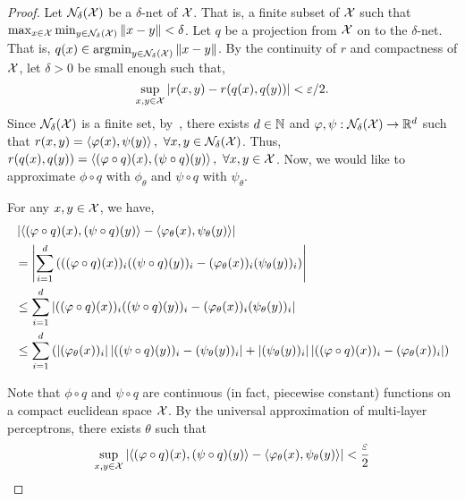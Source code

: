 \begin{proof}
    \hphantom{~}

    Let ${\mathcal{N}}_\delta({\mathcal{X}})$ be a $\delta$-net of ${\mathcal{X}}$. That is, a finite subset of ${\mathcal{X}}$ such that $\max_{x \in {\mathcal{X}}} \min_{y \in {\mathcal{N}}_\delta({\mathcal{X}})} \left\lVert x - y\right\rVert < \delta$. Let $q$ be a projection from ${\mathcal{X}}$ on to the $\delta$-net. That is, $q(x) \in \mathop{\rm argmin}_{y \in {\mathcal{N}}_\delta({\mathcal{X}})} \left\lVert x - y\right\rVert$. By the continuity of $r$ and compactness of ${\mathcal{X}}$, let $\delta > 0$ be small enough such that,
    \begin{equation*}
        \sup_{x, y \in \calX} \abs{r(x,y) - r(q(x), q(y))} < \varepsilon / 2.
    \end{equation*}
    Since ${\mathcal{N}}_\delta({\mathcal{X}})$ is a finite set, by~, there exists $d \in {\mathbb{N}}$ and $\varphi, \psi: {\mathcal{N}}_\delta({\mathcal{X}}) \to \mathbb{R}^d$ such that $r(x, y) = \left \langle \varphi(x), \psi(y) \right\rangle, \ \forall x,y \in {\mathcal{N}}_\delta({\mathcal{X}})$. Thus, $r(q(x), q(y)) = \left \langle (\varphi \circ q)(x), (\psi \circ q)(y) \right\rangle, \ \forall x,y \in {\mathcal{X}}$.  Now, we would like to approximate $\phi \circ q$ with $\phi_\theta$ and $\psi \circ q$ with $\psi_\theta$.

    For any $x, y \in {\mathcal{X}}$, we have,
    \begin{equation*}
        \begin{split}
            &\abs{\iprod{(\phi \circ q)(x)}{(\psi \circ q)(y)} - \iprod{\phi_\theta(x)}{\psi_\theta(y)}} \\
            &= \abs{\sum_{i=1}^{d} \paren{((\phi \circ q)(x))_i ((\psi \circ q)(y))_i - (\phi_\theta(x))_i (\psi_\theta(y))_i}} \\
            &\leq \sum_{i=1}^{d} \abs{((\phi \circ q)(x))_i ((\psi \circ q)(y))_i - (\phi_\theta(x))_i (\psi_\theta(y))_i} \\
        &\leq \sum_{i=1}^d \paren{ \abs{(\phi_\theta(x))_i} \abs{((\psi \circ q)(y))_i - (\psi_\theta(y))_i} + \abs{(\psi_\theta(y))_i} \abs{((\phi \circ q)(x))_i - (\phi_\theta(x))_i}} \\
    \end{split}
\end{equation*}

Note that $\phi \circ q$ and $\psi \circ q$ are continuous (in fact, piecewise constant) functions on a compact euclidean space ${\mathcal{X}}$. By the universal approximation of multi-layer perceptrons, there exists $\theta$ such that
\begin{equation*}
    \sup_{x, y \in \calX} \abs{\iprod{(\phi \circ q)(x)}{(\psi \circ q)(y)} - \iprod{\phi_\theta(x)}{\psi_\theta(y)}} < \frac{\varepsilon}{2}
\end{equation*}


\end{proof}
